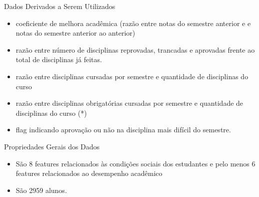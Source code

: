 \begin{frame}{Dados Derivados a Serem Utilizados}
    \begin{itemize}[itemsep=3ex]
        \item coeficiente de melhora acadêmica (razão entre notas do semestre
            anterior e e notas do semestre anterior ao anterior) 
        \item razão entre número de disciplinas reprovadas, trancadas e 
            aprovadas frente ao total de disciplinas já feitas. 
        \item razão entre disciplinas cursadas por semestre e quantidade 
            de disciplinas do curso 
        \item razão entre disciplinas obrigatórias cursadas por semestre e quantidade 
            de disciplinas do curso (*)
        \item flag indicando aprovação ou não na disciplina mais difícil do semestre.
    \end{itemize}
\end{frame}

\begin{frame}{Propriedades Gerais dos Dados}
    \begin{itemize}[itemsep=3ex]
        \item São 8 features relacionados às condições sociais dos estudantes e pelo
            menos 6 features relacionados ao desempenho acadêmico
        \item São 2959 alunos.  
    \end{itemize}
\end{frame}


